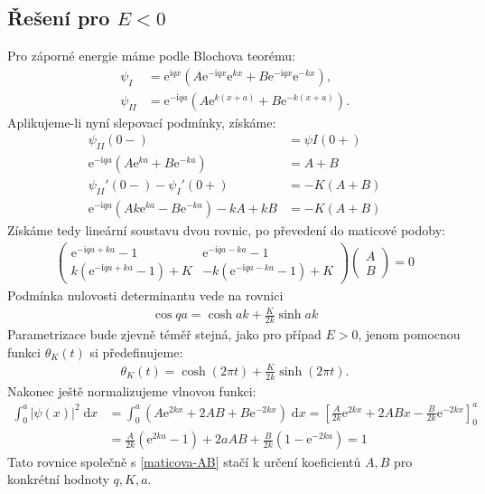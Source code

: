 \documentclass[10pt,a4paper]{article}
\newcommand{\const}[1]{\text{#1}}
\newcommand{\mat}[1]{
    \begin{pmatrix}
        #1
    \end{pmatrix}
}
\renewcommand{\d}[1]{\;\const{d}#1}
\newcommand{\e}[1]{\const{e}^{#1}}
\renewcommand{\i}{\const{i}}
\begin{document}
\subsection{Řešení pro \texorpdfstring{$E<0$}{E<0}}

Pro záporné energie máme podle Blochova teorému:
\begin{align*}
    \psi_I &= \e{\i q x} \left( A \e{-\i q x} \e{kx} + B \e{-\i q x} \e{-kx} \right), \\
    \psi_{II} &= \e{-\i q a} \left( A \e{k(x+a)} + B \e{-k(x+a)} \right).
\end{align*}
Aplikujeme-li nyní slepovací podmínky, získáme:
\begin{align*}
    \psi_{II}(0-) &= \psi{I}(0+) \\
    \e{-\i q a} \left( A \e{ka} +  B \e{-ka}\right) &= A + B
    \\[10pt]
    \psi_{II}'(0-) - \psi_I'(0+) &= - K(A+B) \\
    \e{-\i q a}\left( Ak\e{ka} - B\e{-ka} \right) -kA + kB &= -K(A+B)
\end{align*}
Získáme tedy lineární soustavu dvou rovnic, po převedení do maticové podoby:
\begin{gather}
    \mat{
        \e{-\i qa + ka} - 1 &
        \e{-\i qa - ka} - 1 \\
        k\left(\e{-\i qa + ka} - 1\right) + K &
        -k\left(\e{-\i qa - ka} - 1\right) + K
    }
    \mat{A \\ B} = 0
    \label{maticova-AB}
\end{gather}
Podmínka nulovosti determinantu vede na rovnici
\begin{gather*}
    \cos qa = \cosh ak + \frac{K}{2k} \sinh ak
\end{gather*}
Parametrizace bude zjevně téměř stejná, jako pro případ $E>0$, jenom pomocnou funkci $\theta_K(t)$ si předefinujeme:
\begin{gather*}
    \theta_K(t) = \cosh(2\pi t) + \frac{K}{2k} \sinh(2\pi t).
\end{gather*}
Nakonec ještě normalizujeme vlnovou funkci:
\begin{align*}
    \int_0^a |\psi(x)|^2 \d{x} &=
    \int_0^a \left( A\e{2kx} + 2AB + B\e{-2kx} \right) \d{x} =
    \left[ \frac{A}{2k} \e{2kx} + 2ABx - \frac{B}{2k} \e{-2kx}\right]_0^a
    \\
    &= \frac{A}{2k} \left( \e{2ka} - 1 \right) + 2aAB + \frac{B}{2k} \left( 1 - \e{-2ka} \right)
    = 1
\end{align*}
Tato rovnice společně s \eqref{maticova-AB} stačí k určení koeficientů $A, B$ pro konkrétní hodnoty $q, K, a$.
\end{document}
